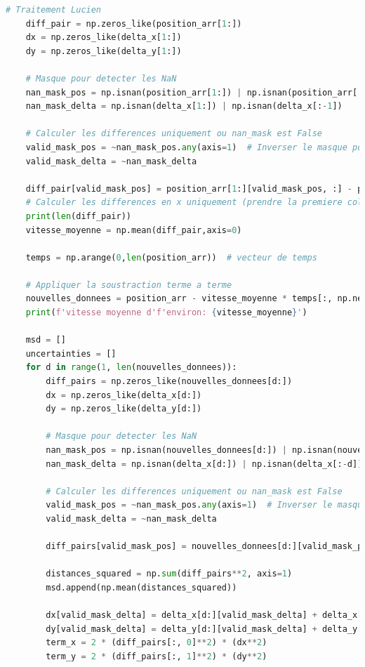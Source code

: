 \documentclass[11pt,letterpaper]{article}
\begin{document}
\begin{lstlisting}[language=python]
    # Traitement Lucien
    diff_pair = np.zeros_like(position_arr[1:])
    dx = np.zeros_like(delta_x[1:])
    dy = np.zeros_like(delta_y[1:])

    # Masque pour detecter les NaN
    nan_mask_pos = np.isnan(position_arr[1:]) | np.isnan(position_arr[:-1])
    nan_mask_delta = np.isnan(delta_x[1:]) | np.isnan(delta_x[:-1])
    
    # Calculer les differences uniquement ou nan_mask est False
    valid_mask_pos = ~nan_mask_pos.any(axis=1)  # Inverser le masque pour obtenir les position_arr valides
    valid_mask_delta = ~nan_mask_delta
    
    diff_pair[valid_mask_pos] = position_arr[1:][valid_mask_pos, :] - position_arr[:-1][valid_mask_pos, :]
    # Calculer les differences en x uniquement (prendre la premiere colonne des positions)
    print(len(diff_pair))
    vitesse_moyenne = np.mean(diff_pair,axis=0)
    
    temps = np.arange(0,len(position_arr))  # vecteur de temps

    # Appliquer la soustraction terme a terme
    nouvelles_donnees = position_arr - vitesse_moyenne * temps[:, np.newaxis]    
    print(f'vitesse moyenne d'f'environ: {vitesse_moyenne}')
    
    msd = []
    uncertainties = []
    for d in range(1, len(nouvelles_donnees)):
        diff_pairs = np.zeros_like(nouvelles_donnees[d:])
        dx = np.zeros_like(delta_x[d:])
        dy = np.zeros_like(delta_y[d:])

        # Masque pour detecter les NaN
        nan_mask_pos = np.isnan(nouvelles_donnees[d:]) | np.isnan(nouvelles_donnees[:-d])
        nan_mask_delta = np.isnan(delta_x[d:]) | np.isnan(delta_x[:-d])
        
        # Calculer les differences uniquement ou nan_mask est False
        valid_mask_pos = ~nan_mask_pos.any(axis=1)  # Inverser le masque pour obtenir les position_arr valides
        valid_mask_delta = ~nan_mask_delta
        
        diff_pairs[valid_mask_pos] = nouvelles_donnees[d:][valid_mask_pos, :] - nouvelles_donnees[:-d][valid_mask_pos, :]

        distances_squared = np.sum(diff_pairs**2, axis=1)
        msd.append(np.mean(distances_squared))  
        
        dx[valid_mask_delta] = delta_x[d:][valid_mask_delta] + delta_x[:-d][valid_mask_delta]
        dy[valid_mask_delta] = delta_y[d:][valid_mask_delta] + delta_y[:-d][valid_mask_delta]
        term_x = 2 * (diff_pairs[:, 0]**2) * (dx**2)
        term_y = 2 * (diff_pairs[:, 1]**2) * (dy**2)


\end{lstlisting}
\end{document}
